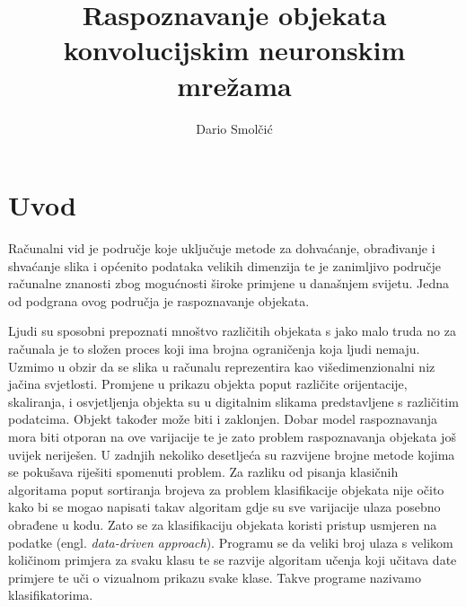 \documentclass[times, utf8, zavrsni, numeric]{fer}
\begin{document}

\title{Raspoznavanje objekata konvolucijskim neuronskim mrežama}

\author{Dario Smolčić}

\maketitle



\tableofcontents

\chapter{Uvod}
Računalni vid je područje koje uključuje metode za dohvaćanje, obrađivanje i shvaćanje slika i općenito podataka velikih dimenzija te je zanimljivo područje računalne znanosti zbog mogućnosti široke primjene u današnjem svijetu. Jedna od podgrana ovog područja je raspoznavanje objekata.

Ljudi su sposobni prepoznati mnoštvo različitih objekata s jako malo truda no za računala je to složen proces koji ima brojna ograničenja koja ljudi nemaju. Uzmimo u obzir da se slika u računalu reprezentira kao višedimenzionalni niz jačina svjetlosti. Promjene u prikazu objekta poput različite orijentacije, skaliranja, i osvjetljenja objekta su u digitalnim slikama predstavljene s različitim podatcima. Objekt također može biti i zaklonjen. Dobar model raspoznavanja mora biti otporan na ove varijacije te je zato problem raspoznavanja objekata još uvijek neriješen. U zadnjih nekoliko desetljeća su razvijene brojne metode kojima se pokušava riješiti spomenuti problem.
Za razliku od pisanja klasičnih algoritama poput sortiranja brojeva za problem klasifikacije objekata nije očito kako bi se mogao napisati takav algoritam gdje su sve varijacije ulaza posebno obrađene u kodu. Zato se za klasifikaciju objekata koristi pristup usmjeren na podatke (engl. \textit{data-driven approach}). Programu se da veliki broj ulaza s velikom količinom primjera za svaku klasu te se razvije algoritam učenja koji učitava date primjere te uči o vizualnom prikazu svake klase. Takve programe nazivamo klasifikatorima.
\end{document}
